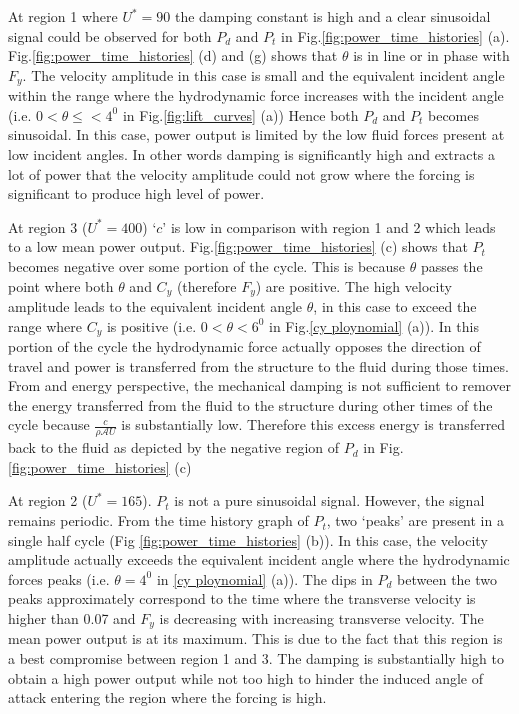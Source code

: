  
 
 
 At region 1 where $U^*=90$ the damping constant is high and a clear sinusoidal signal could be observed for both $P_d$ and $P_t$ in Fig.\ref{fig:power_time_histories} (a). Fig.\ref{fig:power_time_histories} (d) and (g) shows that $\theta$ is in line or in phase with $F_y$.  The velocity amplitude in this case is small and the equivalent incident angle within the range where the hydrodynamic force increases with the incident angle (i.e. $0<\theta \leq < 4^0$ in Fig.\ref{fig:lift_curves} (a)) Hence both $P_d$ and $P_t$ becomes sinusoidal. In this case, power output is limited by the low fluid forces present at low incident angles. In other words damping is significantly high and extracts a lot of power that the velocity amplitude could not grow where the forcing  is significant to produce high level of power.   
 
 
  At region 3 ($U^*= 400$) `$c$' is low in comparison with region 1 and 2 which leads to a low mean power output. Fig.\ref{fig:power_time_histories} (c) shows that $P_t$ becomes negative over some portion of the cycle. This is because $\theta$  passes the point where both $\theta$ and $C_y$ (therefore $F_y$) are positive. The high velocity amplitude leads to the equivalent incident angle $\theta$, in this case to exceed the range where $C_y$ is positive (i.e. $0<\theta<6^0$ in Fig.\ref{cy ploynomial} (a)). In this portion of the cycle the hydrodynamic force actually opposes the direction of travel and power is transferred from the structure to the fluid during those times. From and energy perspective, the mechanical damping is not sufficient to remover the energy transferred from the fluid to the structure during other times of the cycle because $\frac{c}{\rho\mathcal{A}U}$ is substantially low. Therefore this excess energy is transferred back to the fluid as depicted by the negative region of $P_d$ in Fig.\ref{fig:power_time_histories} (c) 
 

At region 2 ($U^*=165$). $P_t$ is not a pure sinusoidal signal. However, the  signal remains periodic. From the time history graph of $P_t$, two `peaks' are present in a single half cycle (Fig \ref{fig:power_time_histories} (b)). In this case, the velocity amplitude actually exceeds the equivalent incident angle where the hydrodynamic forces peaks (i.e. $\theta=4^0$ in \ref{cy ploynomial} (a)). The dips in $P_d$ between the two peaks approximately correspond to the time where the transverse velocity is higher than 0.07 and $F_y$ is decreasing with increasing transverse velocity. The mean power output is at its maximum. This is due to the fact that this region is a best compromise between region 1 and 3. The damping is substantially high to obtain a high power output while not too high to hinder the induced angle of attack entering the region where the forcing is high. 



